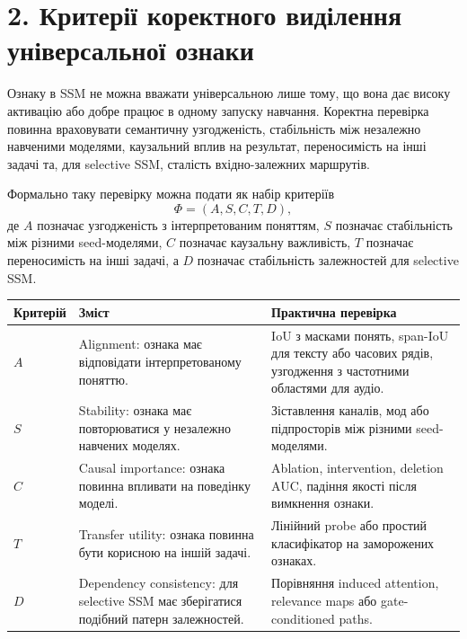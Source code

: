 \documentclass[12pt,a4paper]{article}
\begin{document}
\section*{2. Критерії коректного виділення універсальної ознаки}

Ознаку в SSM не можна вважати універсальною лише тому, що вона дає
високу активацію або добре працює в одному запуску навчання. Коректна
перевірка повинна враховувати семантичну узгодженість, стабільність
між незалежно навченими моделями, каузальний вплив на результат,
переносимість на інші задачі та, для selective SSM, сталість
вхідно-залежних маршрутів.

Формально таку перевірку можна подати як набір критеріїв
\[
    \Phi = (A,S,C,T,D),
\]
де \(A\) позначає узгодженість з інтерпретованим поняттям,
\(S\) позначає стабільність між різними seed-моделями,
\(C\) позначає каузальну важливість,
\(T\) позначає переносимість на інші задачі,
а \(D\) позначає стабільність залежностей для selective SSM.

\begin{center}
\begin{tabularx}{\textwidth}{p{2cm} X X}
\toprule
\textbf{Критерій}
&
\textbf{Зміст}
&
\textbf{Практична перевірка}
\\
\midrule

\(A\)
&
Alignment: ознака має відповідати інтерпретованому поняттю.
&
IoU з масками понять, span-IoU для тексту або часових рядів,
узгодження з частотними областями для аудіо.
\\

\(S\)
&
Stability: ознака має повторюватися у незалежно навчених моделях.
&
Зіставлення каналів, мод або підпросторів між різними seed-моделями.
\\

\(C\)
&
Causal importance: ознака повинна впливати на поведінку моделі.
&
Ablation, intervention, deletion AUC, падіння якості після вимкнення
ознаки.
\\

\(T\)
&
Transfer utility: ознака повинна бути корисною на іншій задачі.
&
Лінійний probe або простий класифікатор на заморожених ознаках.
\\

\(D\)
&
Dependency consistency: для selective SSM має зберігатися подібний
патерн залежностей.
&
Порівняння induced attention, relevance maps або gate-conditioned paths.
\\
\bottomrule
\end{tabularx}
\end{center}
\end{document}
